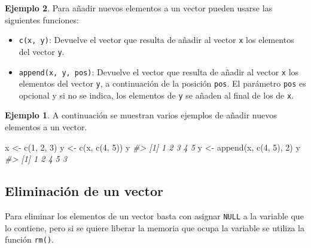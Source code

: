 \documentclass[
]{book}
\newenvironment{Shaded}{\begin{snugshade}}{\end{snugshade}}
\newcommand{\CommentTok}[1]{\textcolor[rgb]{0.56,0.35,0.01}{\textit{#1}}}
\newcommand{\DecValTok}[1]{\textcolor[rgb]{0.00,0.00,0.81}{#1}}
\newcommand{\FunctionTok}[1]{\textcolor[rgb]{0.00,0.00,0.00}{#1}}
\newcommand{\NormalTok}[1]{#1}
\newcommand{\OtherTok}[1]{\textcolor[rgb]{0.56,0.35,0.01}{#1}}
\providecommand{\tightlist}{%
  \setlength{\itemsep}{0pt}\setlength{\parskip}{0pt}}
\theoremstyle{definition}
\theoremstyle{definition}
\newtheorem{example}{Ejemplo}[chapter]
\theoremstyle{definition}
\theoremstyle{definition}
\theoremstyle{remark}
\begin{document}
\begin{example}
Para añadir nuevos elementos a un vector pueden usarse las siguientes funciones:

\begin{itemize}
\tightlist
\item
  \texttt{c(x,\ y)}: Devuelve el vector que resulta de añadir al vector \texttt{x} los elementos del vector \texttt{y}.
\item
  \texttt{append(x,\ y,\ pos)}: Devuelve el vector que resulta de añadir al vector \texttt{x} los elementos del vector \texttt{y}, a continuación de la posición \texttt{pos}. El parámetro \texttt{pos} es opcional y si no se indica, los elementos de \texttt{y} se añaden al final de los de \texttt{x}.
\end{itemize}

\begin{example}

A continuación se muestran varios ejemplos de añadir nuevos elementos a un vector.

\begin{Shaded}
\begin{Highlighting}[]
\NormalTok{x }\OtherTok{\textless{}{-}} \FunctionTok{c}\NormalTok{(}\DecValTok{1}\NormalTok{, }\DecValTok{2}\NormalTok{, }\DecValTok{3}\NormalTok{)}
\NormalTok{y }\OtherTok{\textless{}{-}} \FunctionTok{c}\NormalTok{(x, }\FunctionTok{c}\NormalTok{(}\DecValTok{4}\NormalTok{, }\DecValTok{5}\NormalTok{))}
\NormalTok{y}
\CommentTok{\#\textgreater{} [1] 1 2 3 4 5}
\NormalTok{y }\OtherTok{\textless{}{-}} \FunctionTok{append}\NormalTok{(x, }\FunctionTok{c}\NormalTok{(}\DecValTok{4}\NormalTok{, }\DecValTok{5}\NormalTok{), }\DecValTok{2}\NormalTok{)}
\NormalTok{y}
\CommentTok{\#\textgreater{} [1] 1 2 4 5 3}
\end{Highlighting}
\end{Shaded}

\end{example}

\hypertarget{eliminaciuxf3n-de-un-vector}{%
\subsection{Eliminación de un vector}\label{eliminaciuxf3n-de-un-vector}}

Para eliminar los elementos de un vector basta con asignar \texttt{NULL} a la variable que lo contiene, pero si se quiere liberar la memoria que ocupa la variable se utiliza la función \texttt{rm()}.

\hypertarget{operaciones-aritmuxe9ticas-con-vectores}{%
}
\end{example}
\end{document}

